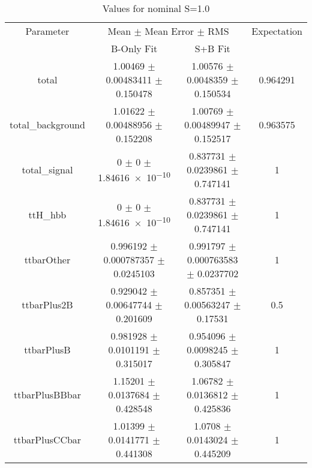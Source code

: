 \begin{table}
\centering
\caption{Values for nominal S=1.0}
\begin{tabular}{cccc}
\toprule
Parameter & \multicolumn{2}{c}{Mean $\pm$ Mean Error $\pm$ RMS} & Expectation\\
 & B-Only Fit & S+B Fit & \\
\midrule
total & \num{1.00469} $\pm$ \num{0.00483411} $\pm$ \num{0.150478} & \num{1.00576} $\pm$ \num{0.0048359} $\pm$ \num{0.150534} & \num{0.964291}\\
total\_background & \num{1.01622} $\pm$ \num{0.00488956} $\pm$ \num{0.152208} & \num{1.00769} $\pm$ \num{0.00489947} $\pm$ \num{0.152517} & \num{0.963575}\\
total\_signal & \num{0} $\pm$ \num{0} $\pm$ \num{1.84616e-10} & \num{0.837731} $\pm$ \num{0.0239861} $\pm$ \num{0.747141} & \num{1}\\
ttH\_hbb & \num{0} $\pm$ \num{0} $\pm$ \num{1.84616e-10} & \num{0.837731} $\pm$ \num{0.0239861} $\pm$ \num{0.747141} & \num{1}\\
ttbarOther & \num{0.996192} $\pm$ \num{0.000787357} $\pm$ \num{0.0245103} & \num{0.991797} $\pm$ \num{0.000763583} $\pm$ \num{0.0237702} & \num{1}\\
ttbarPlus2B & \num{0.929042} $\pm$ \num{0.00647744} $\pm$ \num{0.201609} & \num{0.857351} $\pm$ \num{0.00563247} $\pm$ \num{0.17531} & \num{0.5}\\
ttbarPlusB & \num{0.981928} $\pm$ \num{0.0101191} $\pm$ \num{0.315017} & \num{0.954096} $\pm$ \num{0.0098245} $\pm$ \num{0.305847} & \num{1}\\
ttbarPlusBBbar & \num{1.15201} $\pm$ \num{0.0137684} $\pm$ \num{0.428548} & \num{1.06782} $\pm$ \num{0.0136812} $\pm$ \num{0.425836} & \num{1}\\
ttbarPlusCCbar & \num{1.01399} $\pm$ \num{0.0141771} $\pm$ \num{0.441308} & \num{1.0708} $\pm$ \num{0.0143024} $\pm$ \num{0.445209} & \num{1}\\
\bottomrule
\end{tabular}
\end{table}